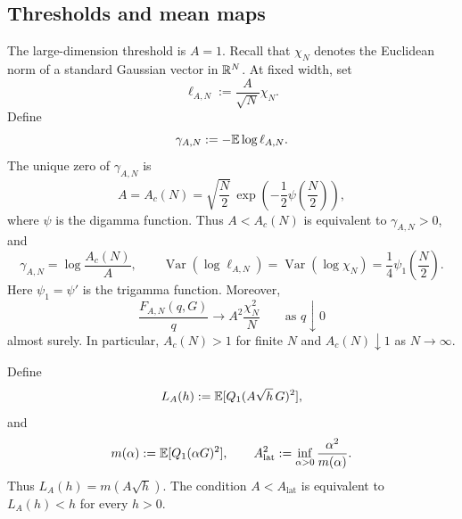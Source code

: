 \documentclass[11pt,reqno,a4paper]{article}
\newcommand{\Ee}{\E}
\DeclareMathOperator{\Var}{Var}
\begin{document}
\subsection{Thresholds and mean maps}
\label{subsec:thresholds-mean-field}

The large-dimension threshold is $A=1$. Recall that $\chi_N$ denotes the
Euclidean norm of a standard Gaussian vector in $\mathbb{R}^N$. At fixed width, set
\begin{equation}\label{eq:gaussian-ell}
  \ell_{A,N}:=\frac A{\sqrt N}\chi_N.
\end{equation}
Define
\begin{equation*}
  \gamma_{A,N}:=-\Ee\log\ell_{A,N}.
\end{equation*}
The unique zero of $\gamma_{A,N}$ is
\begin{equation}\label{eq:fixed-width-critical}
  A=A_c(N)
  =
  \sqrt{\frac N2}\,
  \exp\left(-\frac12\psi\left(\frac N2\right)\right),
\end{equation}
where $\psi$ is the digamma function. Thus $A<A_c(N)$ is equivalent to
$\gamma_{A,N}>0$, and
\begin{equation}\label{eq:gaussian-log-multiplier-moments}
  \gamma_{A,N}=\log\frac{A_c(N)}A,
  \qquad
  \Var(\log\ell_{A,N})
  =
  \Var(\log\chi_N)
  =
  \frac14\psi_1\left(\frac N2\right).
\end{equation}
Here $\psi_1=\psi'$ is the trigamma function. Moreover,
\begin{equation}\label{eq:gaussian-squared-radius-multiplier}
  \frac{F_{A,N}(q,G)}{q}
  \to
  A^2\frac{\chi_N^2}{N}
  \qquad\mbox{as }q\downarrow0
\end{equation}
almost surely. In particular, $A_c(N)>1$ for finite $N$ and
$A_c(N)\downarrow1$ as $N\to\infty$.

Define
\begin{equation}\label{eq:subcritical-lattice-map}
  L_A(h):=\Ee[Q_1(A\sqrt h\,G)^2],
\end{equation}
and
\begin{equation}\label{eq:subcritical-lattice-threshold}
  m(\alpha):=\Ee[Q_1(\alpha G)^2],
  \qquad
  A_{\mathrm{lat}}^2
  :=
  \inf_{\alpha>0}\frac{\alpha^2}{m(\alpha)}.
\end{equation}
Thus $L_A(h)=m(A\sqrt h)$. The condition $A<A_{\mathrm{lat}}$ is
equivalent to $L_A(h)<h$ for every $h>0$.
\end{document}
